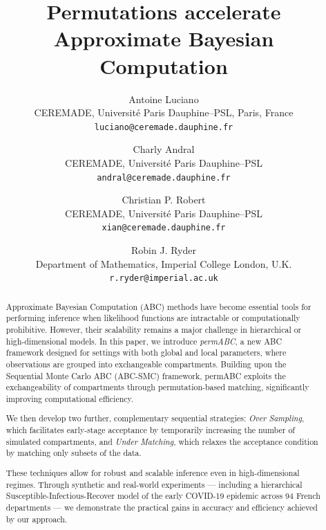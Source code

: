 \documentclass[11pt,a4paper]{article}
\theoremstyle{plain}
\theoremstyle{definition}
\theoremstyle{remark}
\begin{document}
\title{Permutations accelerate Approximate Bayesian Computation}

\author{
Antoine Luciano\\
CEREMADE, Université Paris Dauphine--PSL, Paris, France\\
\texttt{luciano@ceremade.dauphine.fr}
\and
Charly Andral\\
CEREMADE, Université Paris Dauphine--PSL\\
\texttt{andral@ceremade.dauphine.fr}
\and
Christian P. Robert\\
CEREMADE, Université Paris Dauphine--PSL\\
\texttt{xian@ceremade.dauphine.fr}
\and
Robin J. Ryder\\
Department of Mathematics, Imperial College London, U.K.\\
\texttt{r.ryder@imperial.ac.uk}
}



\maketitle

\begin{abstract}
Approximate Bayesian Computation (ABC) methods have become essential tools for performing inference when likelihood functions are intractable or computationally prohibitive. However, their scalability remains a major challenge in hierarchical or high-dimensional models. In this paper, we introduce \emph{permABC}, a new ABC framework designed for settings with both global and local parameters, where observations are grouped into exchangeable compartments.
Building upon the Sequential Monte Carlo ABC (ABC-SMC) framework, permABC exploits the exchangeability of compartments through permutation-based matching, significantly improving computational efficiency. 

We then develop two further, complementary sequential strategies: \emph{Over Sampling}, which  facilitates early-stage acceptance by temporarily increasing the number of simulated compartments, and \emph{Under Matching}, which relaxes the acceptance condition by matching only subsets of the data.

These techniques allow for robust and scalable inference even in high-dimensional regimes. Through synthetic and real-world experiments — including a hierarchical Susceptible-Infectious-Recover model of the early COVID-19 epidemic across 94 French departments — we demonstrate the practical gains in accuracy and efficiency achieved by our approach.
\end{abstract}
\end{document}
